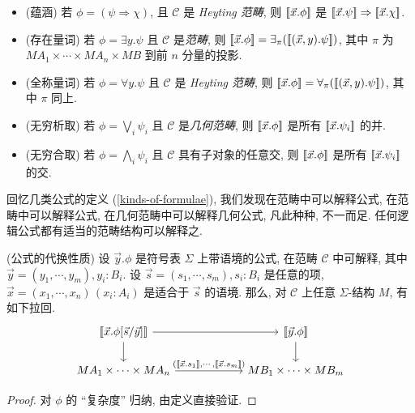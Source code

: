 \begin{definition}
\begin{itemize}
		\item (蕴涵) 若 $\phi = (\psi \Rightarrow \chi)$, 且 $\mathcal C$ 是 \emph{Heyting 范畴}, 则
		${[\![\vec x.\phi]\!]}$ 是 ${[\![\vec x.\psi]\!]} \Rightarrow {[\![\vec x.\chi]\!]}$.
		\item (存在量词) 若 $\phi = \exists y. \psi$ 且 $\mathcal C$ 是\emph{\regular{}范畴}, 则 ${[\![\vec x.\phi]\!]} = \exists_{\pi} ({[\![(\vec x,y).\psi]\!]})$,
		其中 $\pi$ 为 $MA_1\times\cdots\times MA_n \times MB$ 到前 $n$ 分量的投影.
		\item (全称量词) 若 $\phi = \forall y. \psi$ 且 $\mathcal C$ 是 \emph{Heyting 范畴}, 则 ${[\![\vec x.\phi]\!]} = \forall_{\pi} ({[\![(\vec x,y).\psi]\!]})$, 其中 $\pi$ 同上.
		\item (无穷析取) 若 $\phi = \bigvee_i \psi_i$ 且 $\mathcal C$ 是\emph{几何范畴}, 则 ${[\![\vec x.\phi]\!]}$ 是所有 ${[\![\vec x.\psi_i]\!]}$ 的并.
		\item (无穷合取) 若 $\phi = \bigwedge_i \psi_i$ 且 $\mathcal C$ 具有子对象的任意交, 则 ${[\![\vec x.\phi]\!]}$ 是所有 ${[\![\vec x.\psi_i]\!]}$ 的交.
	\end{itemize}
\end{definition}

回忆几类公式的定义 (\ref{kinds-of-formulae}), 我们发现在\regular{}范畴中可以解释\regular{}公式, 在\coherent{}范畴中可以解释\coherent{}公式, 在几何范畴中可以解释几何公式, 凡此种种, 不一而足. 任何逻辑公式都有适当的范畴结构可以解释之.

\begin{prop}
	{(公式的代换性质)}
	设 $\vec y.\phi$ 是符号表 $\Sigma$ 上带语境的公式, 在范畴 $\mathcal C$ 中可解释,
	其中 $\vec y = (y_1,\cdots,y_m), y_i\colon B_i$.
	设 $\vec s = (s_1,\cdots,s_m), s_i\colon B_i$ 是任意的项, $\vec x=(x_1,\cdots,x_n)\,(x_i\colon A_i)$ 是适合于 $\vec s$ 的语境.
	那么, 对 $\mathcal C$ 上任意 $\Sigma$-结构 $M$,
	有如下拉回.
	\[\begin{tikzcd}[ampersand replacement=\&,column sep=6em]
		{\interpretation{\vec x.\phi[\vec s / \vec y]}} \& {\interpretation{\vec y.\phi}} \\
		{MA_1\times\cdots\times MA_n} \& {MB_1\times\cdots\times MB_m}
		\arrow[from=1-1, to=2-1]
		\arrow["{(\interpretation{\vec x.s_1},\cdots,\interpretation{\vec x.s_m})}", from=2-1, to=2-2]
		\arrow[from=1-1, to=1-2]
		\arrow[from=1-2, to=2-2]
	\end{tikzcd}\]
\end{prop}
\begin{proof}
	对 $\phi$ 的 ``复杂度'' 归纳, 由定义直接验证.
\end{proof}

